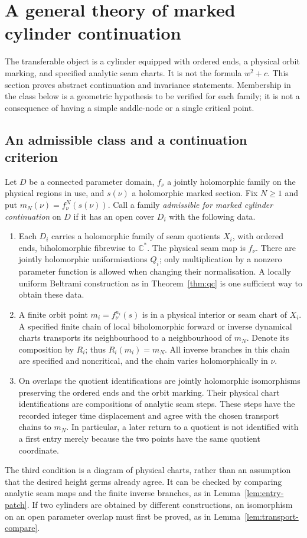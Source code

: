 \documentclass[11pt]{article}
\newcommand{\C}{\mathbb C}
\begin{document}
\section{A general theory of marked cylinder continuation}
\label{sec:general-cylinders}
The transferable object is a cylinder equipped with ordered ends, a
physical orbit marking, and specified analytic seam charts. It is not
the formula $w^2+c$. This section proves abstract continuation and
invariance statements. Membership in the class below is a geometric
hypothesis to be verified for each family; it is not a consequence of
having a simple saddle-node or a single critical point.

\subsection{An admissible class and a continuation criterion}
Let $D$ be a connected parameter domain, $f_\nu$ a jointly holomorphic
family on the physical regions in use, and $s(\nu)$ a holomorphic marked
section. Fix $N\ge1$ and put $m_N(\nu)=f_\nu^N(s(\nu))$. Call a family
\emph{admissible for marked cylinder continuation} on $D$ if it has an
open cover $D_i$ with the following data.
\begin{enumerate}
\item Each $D_i$ carries a holomorphic family of seam quotients $X_i$,
  with ordered ends, biholomorphic fibrewise to $\C^*$. The physical seam
  map is $f_\nu$. There are jointly holomorphic uniformisations $Q_i$;
  only multiplication by a nonzero parameter function is allowed when
  changing their normalisation. A locally uniform Beltrami construction
  as in Theorem~\ref{thm:qc} is one sufficient way to obtain these data.
\item A finite orbit point $m_i=f_\nu^{n_i}(s)$ is in a physical interior
  or seam chart of $X_i$. A specified finite chain of local biholomorphic
  forward or inverse dynamical charts transports its neighbourhood to a
  neighbourhood of $m_N$. Denote its composition by $R_i$; thus
  $R_i(m_i)=m_N$. All inverse branches in this chain are specified and
  noncritical, and the chain varies holomorphically in $\nu$.
\item On overlaps the quotient identifications are jointly holomorphic
  isomorphisms preserving the ordered ends and the orbit marking. Their
  physical chart identifications are compositions of analytic seam
  steps. These steps have the recorded integer time displacement and
  agree with the chosen transport chains to $m_N$. In particular, a
  later return to a quotient is not identified with a first entry merely
  because the two points have the same quotient coordinate.
\end{enumerate}
The third condition is a diagram of physical charts, rather than an
assumption that the desired height germs already agree. It can be checked
by comparing analytic seam maps and the finite inverse branches, as in
Lemma~\ref{lem:entry-patch}. If two cylinders are obtained by different
constructions, an isomorphism on an open parameter overlap must first
be proved, as in Lemma~\ref{lem:transport-compare}.
\end{document}
